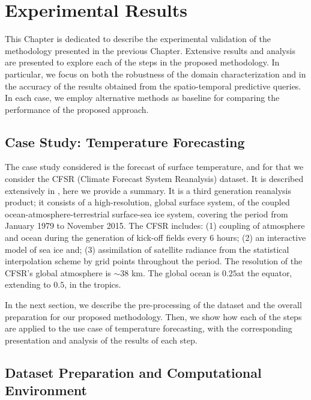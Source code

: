 \chapter{Experimental Results}
\label{chapter_Experimental_Results}

This Chapter is dedicated to describe the experimental validation of the methodology presented in the previous Chapter. Extensive results and analysis are presented to explore each of the steps in the proposed methodology. In particular, we focus on both the robustness of the domain characterization and in the accuracy of the results obtained from the spatio-temporal predictive queries. In each case, we employ alternative methods as baseline for comparing the performance of the proposed approach.


\section{Case Study: Temperature Forecasting}

The case study considered is the forecast of surface temperature, and for that we consider the CFSR (Climate Forecast System Reanalysis) dataset. It is described extensively in \cite{Saha2010}, here we provide a summary. It is a third generation reanalysis product; it consists of a high-resolution, global surface system, of the coupled ocean-atmosphere-terrestrial surface-sea ice system, covering the period from January 1979 to November 2015. The CFSR includes: (1) coupling of atmosphere and ocean during the generation of kick-off fields every 6 hours; (2) an interactive model of sea ice and; (3) assimilation of satellite radiance from the statistical interpolation scheme by grid points throughout the period. The resolution of the CFSR's global atmosphere is $\sim 38$ km. The global ocean is $0.25$\textdegree at the equator, extending to $0.5$\textdegree, in the tropics. 

In the next section, we describe the pre-processing of the dataset and the overall preparation for our proposed methodology. Then, we show how each of the steps are applied to the use case of temperature forecasting, with the corresponding presentation and analysis of the results of each step.

\section{Dataset Preparation and Computational Environment}
\label{sec:DatasetPreparation}

